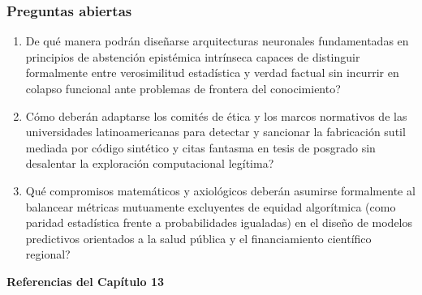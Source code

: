 \subsubsection*{Preguntas abiertas}
\begin{enumerate}[leftmargin=1.8em, itemsep=0.35em]
    \item \textquestiondown De qué manera podrán diseñarse arquitecturas neuronales fundamentadas en principios de abstención epistémica intrínseca capaces de distinguir formalmente entre verosimilitud estadística y verdad factual sin incurrir en colapso funcional ante problemas de frontera del conocimiento?
    \item \textquestiondown Cómo deberán adaptarse los comités de ética y los marcos normativos de las universidades latinoamericanas para detectar y sancionar la fabricación sutil mediada por código sintético y citas fantasma en tesis de posgrado sin desalentar la exploración computacional legítima?
    \item \textquestiondown Qué compromisos matemáticos y axiológicos deberán asumirse formalmente al balancear métricas mutuamente excluyentes de equidad algorítmica (como paridad estadística frente a probabilidades igualadas) en el diseño de modelos predictivos orientados a la salud pública y el financiamiento científico regional?
\end{enumerate}

\newpage
{}
\vspace*{0.3cm}
{\Huge \textbf{Referencias del Capítulo 13}}\\[0.35cm]

